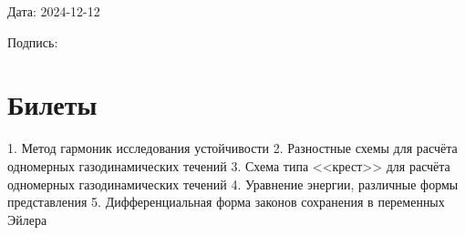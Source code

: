 \documentclass[a4paper,12pt]{article}
\begin{document}
Дата: 2024-12-12

Подпись: \underline{\hspace{3cm}}

\section*{Билеты}
1. Метод гармоник исследования устойчивости
2. Разностные схемы для расчёта одномерных газодинамических течений
3. Схема типа <<крест>> для расчёта одномерных газодинамических течений
4. Уравнение энергии, различные формы представления
5. Дифференциальная форма законов сохранения в переменных Эйлера
\end{document}
